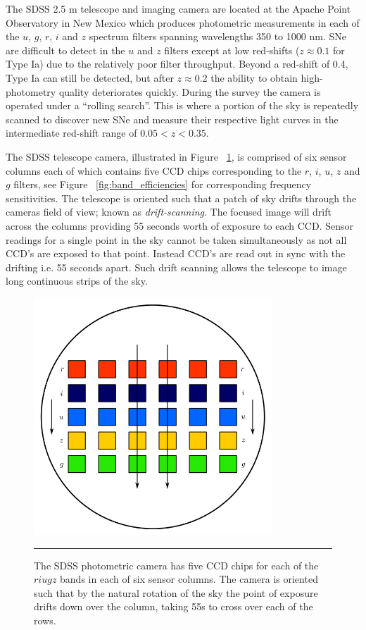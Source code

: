 The SDSS 2.5 m telescope and imaging camera are located at the Apache Point Observatory in New Mexico which produces photometric measurements in each of the $u$, $g$, $r$, $i$ and $z$ spectrum filters spanning wavelengths 350 to 1000 nm.
SNe are difficult to detect in the $u$ and $z$ filters except at low red-shifts ($z \approx 0.1$ for Type Ia) due to the relatively poor filter throughput.
Beyond a red-shift of 0.4, Type Ia can still be detected, but after $z \approx 0.2$ the ability to obtain high-photometry quality deteriorates quickly.
During the survey the camera is operated under a ``rolling search''.
This is where a portion of the sky is repeatedly scanned to discover new SNe and measure their respective light curves in the intermediate red-shift range of $0.05 < z < 0.35$.

The SDSS telescope camera, illustrated in Figure ~\ref{fig:sdss_camera}, is comprised of six sensor columns each of which contains five CCD chips corresponding to the $r$, $i$, $u$, $z$ and $g$ filters, see Figure ~\ref{fig:band_efficiencies} for corresponding frequency sensitivities.
The telescope is oriented such that a patch of sky drifts through the cameras field of view; known as \textit{drift-scanning}.
The focused image will drift across the columns providing 55 seconds worth of exposure to each CCD.
Sensor readings for a single point in the sky cannot be taken simultaneously as not all CCD’s are exposed to that point.
Instead CCD’s are read out in sync with the drifting i.e. 55 seconds apart.
Such drift scanning allows the telescope to image long continuous strips of the sky.
\begin{figure}[htbp]
	\centering
		\includegraphics[width = 0.8\textwidth]{./Figures/lise_paper_sdss_camera.jpg}
		\rule{35em}{0.5pt}
	\caption[SDSS Camera]{The SDSS photometric camera has five CCD chips for each of the $riugz$ bands in each of six sensor columns. The camera is oriented such that by the natural rotation of the sky the point of exposure drifts down over the column, taking 55s to cross over each of the rows. }
	\label{fig:sdss_camera}
\end{figure}
